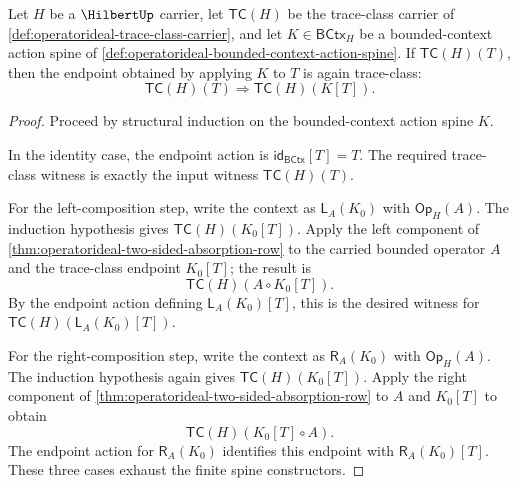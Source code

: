 \begin{theorem}
\label{thm:operatorideal-trace-class-finite-context-closure}
Let $H$ be a $\HilbertUp$ carrier, let $\mathsf{TC}(H)$ be the trace-class carrier of \autoref{def:operatorideal-trace-class-carrier}, and let $K\in\mathsf{BCtx}_H$ be a bounded-context action spine of \autoref{def:operatorideal-bounded-context-action-spine}. If $\mathsf{TC}(H)(T)$, then the endpoint obtained by applying $K$ to $T$ is again trace-class:
$$
\mathsf{TC}(H)(T)\Longrightarrow \mathsf{TC}(H)(K[T]).
$$
\end{theorem}
\begin{proof}
Proceed by structural induction on the bounded-context action spine $K$.

In the identity case, the endpoint action is $\mathsf{id}_{\mathsf{BCtx}}[T]=T$. The required trace-class witness is exactly the input witness $\mathsf{TC}(H)(T)$.

For the left-composition step, write the context as $\mathsf{L}_A(K_0)$ with $\mathsf{Op}_H(A)$. The induction hypothesis gives $\mathsf{TC}(H)(K_0[T])$. Apply the left component of \autoref{thm:operatorideal-two-sided-absorption-row} to the carried bounded operator $A$ and the trace-class endpoint $K_0[T]$; the result is
$$
\mathsf{TC}(H)(A\circ K_0[T]).
$$
By the endpoint action defining $\mathsf{L}_A(K_0)[T]$, this is the desired witness for $\mathsf{TC}(H)(\mathsf{L}_A(K_0)[T])$.

For the right-composition step, write the context as $\mathsf{R}_A(K_0)$ with $\mathsf{Op}_H(A)$. The induction hypothesis again gives $\mathsf{TC}(H)(K_0[T])$. Apply the right component of \autoref{thm:operatorideal-two-sided-absorption-row} to $A$ and $K_0[T]$ to obtain
$$
\mathsf{TC}(H)(K_0[T]\circ A).
$$
The endpoint action for $\mathsf{R}_A(K_0)$ identifies this endpoint with $\mathsf{R}_A(K_0)[T]$. These three cases exhaust the finite spine constructors.
\end{proof}

